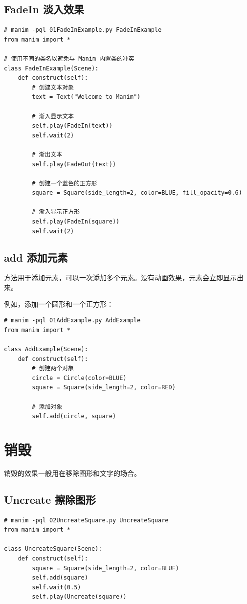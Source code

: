 \subsection{FadeIn 淡入效果}
\label{subsubsec:manim_animation_create_fadein}
\begin{lstlisting}[style=pythonstyle]
# manim -pql 01FadeInExample.py FadeInExample
from manim import *

# 使用不同的类名以避免与 Manim 内置类的冲突
class FadeInExample(Scene):
    def construct(self):
        # 创建文本对象
        text = Text("Welcome to Manim")

        # 渐入显示文本
        self.play(FadeIn(text))
        self.wait(2)

        # 渐出文本
        self.play(FadeOut(text))

        # 创建一个蓝色的正方形
        square = Square(side_length=2, color=BLUE, fill_opacity=0.6)

        # 渐入显示正方形
        self.play(FadeIn(square))
        self.wait(2)
\end{lstlisting}

\subsection{add 添加元素}
\label{subsubsec:manim_animation_create_add}
 方法用于添加元素，可以一次添加多个元素。没有动画效果，元素会立即显示出来。

例如，添加一个圆形和一个正方形：
\begin{lstlisting}[style=pythonstyle]
# manim -pql 01AddExample.py AddExample
from manim import *

class AddExample(Scene):
    def construct(self):
        # 创建两个对象
        circle = Circle(color=BLUE)
        square = Square(side_length=2, color=RED)

        # 添加对象
        self.add(circle, square)
\end{lstlisting}

\section{销毁}
\label{sec:manim_animation_destroy}
销毁的效果一般用在移除图形和文字的场合。

\subsection{Uncreate 擦除图形}
\label{subsubsec:manim_animation_destroy_uncreate}
\begin{lstlisting}[style=pythonstyle]
# manim -pql 02UncreateSquare.py UncreateSquare
from manim import *

class UncreateSquare(Scene):
    def construct(self):
        square = Square(side_length=2, color=BLUE)
        self.add(square)
        self.wait(0.5)
        self.play(Uncreate(square))
\end{lstlisting}

